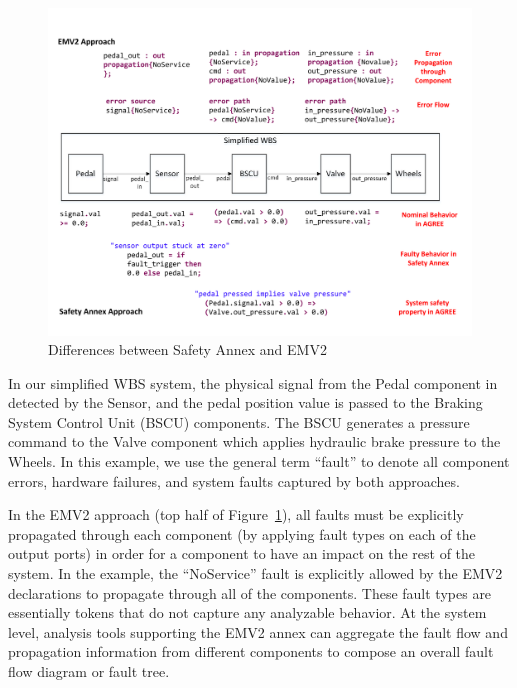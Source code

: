 \begin{figure}[t]
	\vspace{-0.19in}
	\centering
	\includegraphics[trim=0 9 0 5,clip,width=\textwidth]{images/Comparison_with_EMV2.pdf}
	\caption{Differences between Safety Annex and EMV2}
	\label{fig:comparison_with_EMV2}
\end{figure} 

In our simplified WBS system, the physical signal from the Pedal component in detected by the Sensor, and the pedal position value is passed to the Braking System Control Unit (BSCU) components.  The BSCU generates a pressure command to the Valve component which applies hydraulic brake pressure to the Wheels. In this example, we use the general term ``fault'' to denote all component errors, hardware failures, and system faults captured by both approaches.

In the EMV2 approach (top half of Figure~\ref{fig:comparison_with_EMV2}), all faults must be explicitly propagated through each component (by applying fault types on each of the output ports) in order for a component to have an impact on the rest of the system. In the example, the ``NoService'' fault is explicitly allowed by the EMV2 declarations to propagate through all of the components.  These fault types are essentially tokens that do not capture any analyzable behavior.  At the system level, analysis tools supporting the EMV2 annex can aggregate the fault flow and propagation information from different components to compose an overall fault flow diagram or fault tree.

